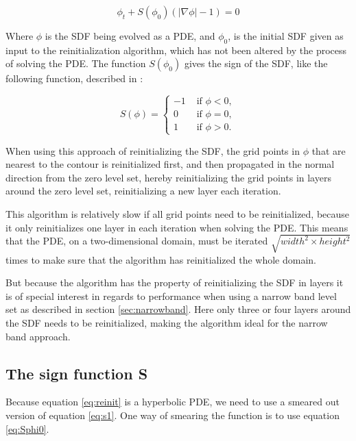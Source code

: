 \begin{equation}
\label{eq:reinit}
\phi_t + S(\phi_0)(|\nabla \phi| - 1) = 0
\end{equation}

Where $\phi$ is the SDF being evolved as a PDE, and $\phi_0$, is the
initial SDF given as input to the reinitialization algorithm, which
has not been altered by the process of solving the PDE. The function
$S(\phi_0)$ gives the sign of the SDF, like the following function,
described in :

\begin{equation}
\label{eq:s1}
S(\phi) =
\begin{cases}
-1 &\mbox{ if } \phi < 0, \\
 0 &\mbox{ if } \phi = 0, \\
 1 &\mbox{ if } \phi > 0.
\end{cases}
\end{equation}

When using this approach of reinitializing the SDF, the grid
points in $\phi$ that are nearest to the contour is reinitialized
first, and then propagated in the normal direction from the zero
level set, hereby reinitializing the grid points in layers around the
zero level set, reinitializing a new layer each iteration.

This algorithm is relatively slow if all grid points need to be
reinitialized, because it only reinitializes one layer in each
iteration when solving the PDE. This means that the PDE, on a
two-dimensional domain, must be iterated
$\sqrt{width^2 \times height^2}$ times to make sure that the algorithm
has reinitialized the whole domain. 

But because the algorithm has the property of reinitializing the SDF
in layers it is of special interest in regards to performance when
using a narrow band level set as described in section
\vref{sec:narrowband}. Here only three or four layers around the SDF needs
to be reinitialized, making the algorithm ideal for the narrow band
approach.

\subsection{The sign function S}
Because equation \ref{eq:reinit} is a hyperbolic PDE, we need to use a
smeared out version of equation \eqref{eq:s1}. One way of smearing the
function is to use equation \eqref{eq:Sphi0}.

